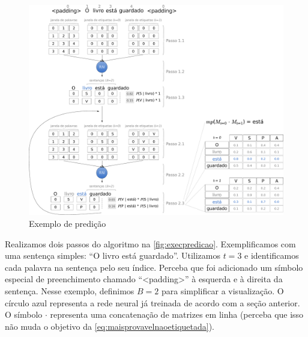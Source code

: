 \begin{figure}[!htb]
    \caption{Exemplo de predição}\label{fig:execpredicao}
    \begin{center}
        \includegraphics[scale=0.25]{img/algoritmodepredicao.pdf}
    \end{center}
\end{figure}

Realizamos dois passos do algoritmo na \autoref{fig:execpredicao}. Exemplificamos com uma sentença simples: ``O livro está guardado''. Utilizamos $t = 3$ e identificamos cada palavra na sentença pelo seu índice. Perceba que foi adicionado um símbolo especial de preenchimento chamado ``<padding>'' à esquerda e à direita da sentença. Nesse exemplo, definimos $B = 2$ para simplificar a visualização. O círculo azul representa a rede neural já treinada de acordo com a seção anterior. O símbolo $\cdot$ representa uma concatenação de matrizes em linha (perceba que isso não muda o objetivo da \autoref{eq:maisprovavelnaoetiquetada}).

\newpage

